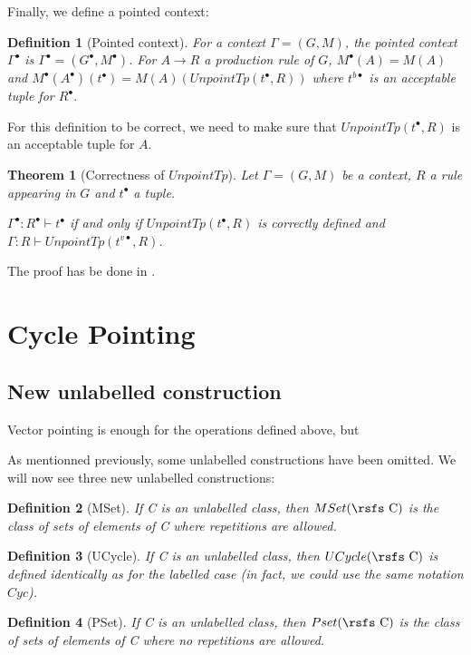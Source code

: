 \documentclass{article}
\newtheorem{theorem}{Theorem}
\newtheorem{definition}{Definition}
\begin{document}
Finally, we define a pointed context:
\begin{definition}[Pointed context]
For a context $\Gamma = (G, M)$, the pointed context $\Gamma^{\bullet}$ is $\Gamma^{\bullet} = (G^{\bullet}, M^{\bullet})$. For $A \rightarrow R$ a production rule of $G$, $M^{\bullet}(A) = M(A)$ and $M^{\bullet}(A^{\bullet})(t^\bullet) = M(A)(UnpointTp(t^{\bullet}, R))$ where $t^{b\bullet}$ is an acceptable tuple for $R^{\bullet}$.
\end{definition}

For this definition to be correct, we need to make sure that $UnpointTp(t^{\bullet}, R)$ is an acceptable tuple for $A$.

\begin{theorem}[Correctness of $UnpointTp$]
Let $\Gamma = (G, M)$ be a context, $R$ a rule appearing in $G$ and $t^{\bullet}$ a tuple.
 
 $\Gamma^{\bullet}:R^{\bullet} \vdash t^{\bullet}$ if and only if $UnpointTp(t^{\bullet}, R)$ is correctly defined and $\Gamma:R \vdash UnpointTp(t^{v\bullet}, R)$.
\end{theorem}

The proof has be done in \cite{LAPIN}.
\section{Cycle Pointing}
\subsection{New unlabelled construction}
Vector pointing is enough for the operations defined above, but 

As mentionned previously, some unlabelled constructions have been omitted. We will now see three new unlabelled constructions:

\begin{definition}[MSet]
If {\rsfs C} is an unlabelled class, then $MSet(\text{\rsfs C})$ is the class of sets of elements of {\rsfs C} where repetitions are allowed.
\end{definition}

\begin{definition}[UCycle]
If {\rsfs C} is an unlabelled class, then $UCycle(\text{\rsfs C})$ is defined identically as for the labelled case (in fact, we could use the same notation $Cyc$).
\end{definition}

\begin{definition}[PSet]
If {\rsfs C} is an unlabelled class, then $Pset(\text{\rsfs C})$ is the class of sets of elements of {\rsfs C} where no repetitions are allowed.
\end{definition}
\end{document}
